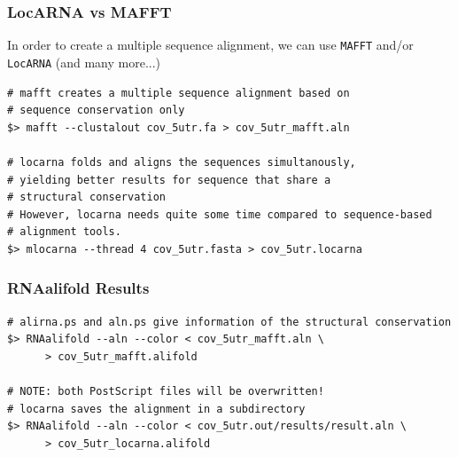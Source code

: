 \begin{frame}[c, fragile]\frametitle{LocARNA vs MAFFT}
  In order to create a multiple sequence alignment, we can use \texttt{MAFFT} and/or \texttt{LocARNA} (and many more...)
  \begin{lstlisting}
# mafft creates a multiple sequence alignment based on
# sequence conservation only
$> mafft --clustalout cov_5utr.fa > cov_5utr_mafft.aln

# locarna folds and aligns the sequences simultanously,
# yielding better results for sequence that share a
# structural conservation
# However, locarna needs quite some time compared to sequence-based 
# alignment tools.
$> mlocarna --thread 4 cov_5utr.fasta > cov_5utr.locarna
  \end{lstlisting}   
\end{frame}

\begin{frame}[c, fragile]\frametitle{RNAalifold Results}
  \begin{lstlisting}
# alirna.ps and aln.ps give information of the structural conservation
$> RNAalifold --aln --color < cov_5utr_mafft.aln \ 
      > cov_5utr_mafft.alifold

# NOTE: both PostScript files will be overwritten!
# locarna saves the alignment in a subdirectory
$> RNAalifold --aln --color < cov_5utr.out/results/result.aln \ 
      > cov_5utr_locarna.alifold
  \end{lstlisting}
\end{frame}

